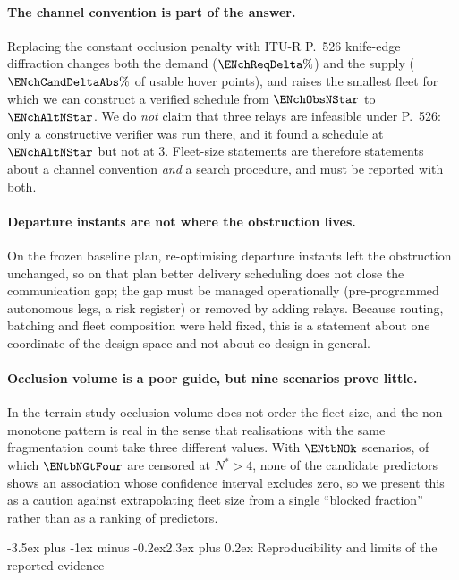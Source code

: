 \documentclass[11pt]{article}
\makeatletter
\def\section{\@startsection{section}{1}{\z@}%
    {1.0\baselineskip plus 0.25\baselineskip minus 0.25\baselineskip}%
    {0.4\baselineskip}%
    {\normalfont\normalsize\centering\bfseries}}%
\renewcommand{\section}{\@startsection{section}{1}{\z@}%
      {-3.5ex plus -1ex minus -0.2ex}{2.3ex plus 0.2ex}%
      {\normalfont\Large\bfseries}}%
\renewcommand{\section}{\@startsection{section}{1}{\z@}%
      {-3.5ex plus -1ex minus -0.2ex}{2.3ex plus 0.2ex}%
      {\normalfont\large\bfseries}}%
\theoremstyle{dshplain}
\theoremstyle{dshdefn}
\makeatother
\begin{document}
\paragraph{The channel convention is part of the answer.}
Replacing the constant occlusion penalty with ITU-R P.~526 knife-edge
diffraction changes both the demand ($\ENchReqDelta\%$) and the supply
($\ENchCandDeltaAbs\%$ of usable hover points), and raises the smallest fleet for
which we can construct a verified schedule from $\ENchObsNStar$ to
$\ENchAltNStar$. We do \emph{not} claim that three relays are infeasible under
P.~526: only a constructive verifier was run there, and it found a schedule at
$\ENchAltNStar$ but not at $3$. Fleet-size statements are therefore statements
about a channel convention \emph{and} a search procedure, and must be reported
with both.

\paragraph{Departure instants are not where the obstruction lives.}
On the frozen baseline plan, re-optimising departure instants left the obstruction
unchanged, so on that plan better delivery scheduling does not close the
communication gap; the gap must be managed operationally (pre-programmed
autonomous legs, a risk register) or removed by adding relays. Because routing,
batching and fleet composition were held fixed, this is a statement about one
coordinate of the design space and not about co-design in general.

\paragraph{Occlusion volume is a poor guide, but nine scenarios prove little.}
In the terrain study occlusion volume does not order the fleet size, and the
non-monotone pattern is real in the sense that realisations with the same
fragmentation count take three different values. With $\ENtbNOk$ scenarios, of
which $\ENtbNGtFour$ are censored at $N^{*}>4$, none of the candidate predictors
shows an association whose confidence interval excludes zero, so we present this
as a caution against extrapolating fleet size from a single ``blocked fraction''
rather than as a ranking of predictors.

\section{Reproducibility and limits of the reported evidence}
\label{sec:reproducible}
\end{document}
